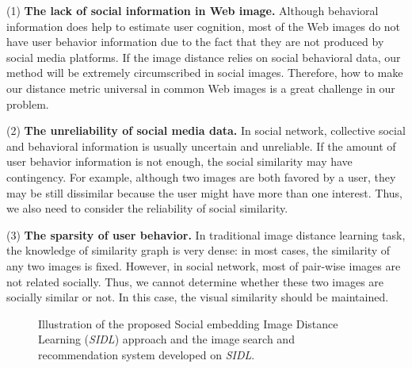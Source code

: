 (1) \textbf{The lack of social information in Web image.} Although behavioral information does help to estimate user cognition, most of the Web images do not have user behavior information due to the fact that they are not produced by social media platforms. If the image distance relies on  social behavioral data, our method will be extremely circumscribed in social images. Therefore, how to make our distance metric universal in common Web images is a great challenge in our problem.

(2) \textbf{The unreliability of social media data.} In social network, collective social and behavioral information is usually uncertain and unreliable. If the amount of user behavior information is not enough, the social similarity may have contingency. For example, although two images are both favored by a user, they may be still dissimilar because the user might have more than one interest. Thus, we also need to consider the reliability of social similarity.

(3) \textbf{The sparsity of user behavior.} In traditional image distance learning task, the knowledge of similarity graph is very dense: in most cases, the similarity of any two images is
fixed. However, in social network, most of pair-wise images are not related socially. Thus, we cannot determine whether these two images are socially similar or not. In this case, the visual similarity should be maintained.

\begin{figure*}
\centering
{}
\caption{Illustration of the proposed Social embedding Image Distance Learning (\emph{SIDL}) approach and the image search and recommendation system developed on \emph{SIDL}.}
\label{framework}
\end{figure*}

